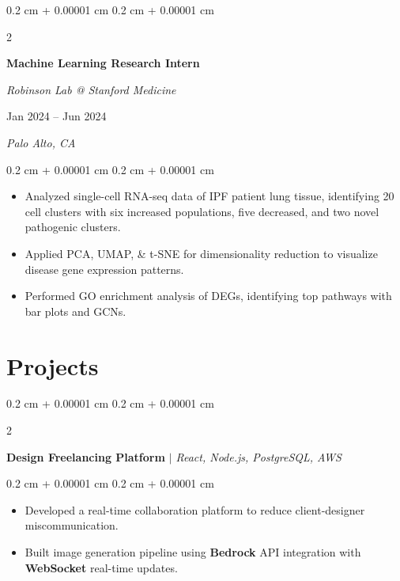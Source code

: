 \documentclass[10pt, letterpaper]{article}
\newenvironment{highlights}{
    \begin{itemize}[
        topsep=0.10 cm,
        parsep=0.10 cm,
        partopsep=0pt,
        itemsep=0pt,
        leftmargin=0.4 cm + 10pt
    ]
}{
    \end{itemize}
} %
\newenvironment{onecolentry}{
    \begin{adjustwidth}{
        0.2 cm + 0.00001 cm
    }{
        0.2 cm + 0.00001 cm
    }
}{
    \end{adjustwidth}
} %
\newenvironment{twocolentry}[2][]{
    \onecolentry
    \def\secondColumn{#2}
    \setcolumnwidth{\fill, 5.6 cm}
    \begin{paracol}{2}
}{
    \switchcolumn \raggedleft \secondColumn
    \end{paracol}
    \endonecolentry
} %
\let\hrefWithoutArrow\href
\renewcommand{\href}[2]{\hrefWithoutArrow{#1}{\ifthenelse{\equal{#2}{}}{ }{#2 }\raisebox{.15ex}{\footnotesize \faExternalLink*}}}
\begin{document}
        \vspace{0.3 cm}

        \begin{twocolentry}{
        Jan 2024 -- Jun 2024    
            
        \textit{Palo Alto, CA}}
            \textbf{Machine Learning Research Intern}
            
            \textit{Robinson Lab @ Stanford Medicine \href{https://drive.google.com/file/d/1cgRNPQy-6pXMvyiAH8pL8GQbGyIG8JlY/view?usp=sharing}{}}
        \end{twocolentry}

        \vspace{0.10 cm}
        \begin{onecolentry}
            \begin{highlights}
                \item Analyzed single-cell RNA-seq data of IPF patient lung tissue, identifying 20 cell clusters with six increased populations, five decreased, and two novel pathogenic clusters.
                \item Applied PCA, UMAP, \& t-SNE for dimensionality reduction to visualize disease gene expression patterns.
                \item Performed GO enrichment analysis of DEGs, identifying top pathways with bar plots and GCNs.
            \end{highlights}
        \end{onecolentry}

    
    \section{Projects}
        
        \begin{twocolentry}{}
            \textbf{Design Freelancing Platform} \textit{ $|$ React, Node.js, PostgreSQL, AWS}
            \href{https://github.com/rob-9/echo}{}
        \end{twocolentry}

        \vspace{0.10 cm}
        \begin{onecolentry}
            \begin{highlights}
                \item Developed a real-time collaboration platform to reduce client-designer miscommunication.
                \item Built image generation pipeline using \textbf{Bedrock} API integration with \textbf{WebSocket} real-time updates.
            \end{highlights}
        \end{onecolentry}
\end{document}
